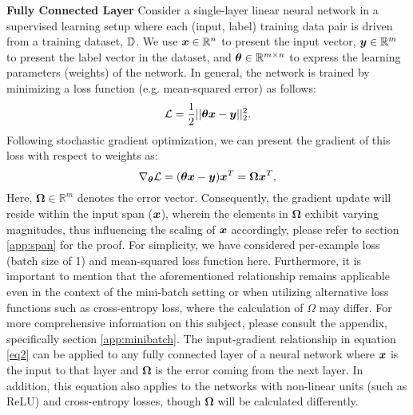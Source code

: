 \documentclass{article}
\begin{document}
\textbf{Fully Connected Layer} \label{sec:fc-layer}
Consider a single-layer linear neural network in a supervised learning setup where each (input, label) training data pair is driven from a training dataset, ${\mathbb{D}}$. We use ${\bm{x}} \in \mathbb{R}^n$ to present the input vector, ${\bm{y}} \in \mathbb{R}^m$ to present the label vector in the dataset, and ${\bm{\theta}} \in \mathbb{R}^{m\times n} $ to express the learning parameters (weights) of the network. In general,  the network is trained by minimizing a loss function (e.g. mean-squared error) as follows:
\begin{equation}\label{eq1}
   \mathcal{L} = \frac{1}{2} || {\bm{\theta}} {\bm{x}} -{\bm{y}} ||_{2}^2.
\end{equation}
Following stochastic gradient optimization, we can present the gradient of this loss with respect to weights as: \begin{equation}\label{eq2}
    \nabla_{{\bm{\theta}}} \mathcal{L} = ({\bm{\theta}} {\bm{x}} -{\bm{y}}) {\bm{x}}^T = \bm{\Omega} {\bm{x}}^T,
\end{equation}
Here, $\bm{\Omega} \in \mathbb{R}^m$ denotes the error vector. Consequently, the gradient update will reside within the input span (${\bm{x}}$), wherein the elements in $\bm{\Omega}$ exhibit varying magnitudes, thus influencing the scaling of ${\bm{x}}$ accordingly, please refer to section \ref{app:span} for the proof. For simplicity, we have considered per-example loss (batch size of 1) and mean-squared loss function here. Furthermore, it is important to mention that the aforementioned relationship remains applicable even in the context of the mini-batch setting or when utilizing alternative loss functions such as cross-entropy loss, where the calculation of $\Omega$ may differ. For more comprehensive information on this subject, please consult the appendix, specifically section \ref{app:minibatch}. The input-gradient relationship in equation \ref{eq2} can be applied to any fully connected layer of a neural network where ${\bm{x}}$ is the input to that layer and $\bm{\Omega}$ is the error coming from the next layer. In addition, this equation also applies to the networks with non-linear units (such as ReLU) and cross-entropy losses, though $\bm{\Omega}$ will be calculated differently. 
\end{document}
